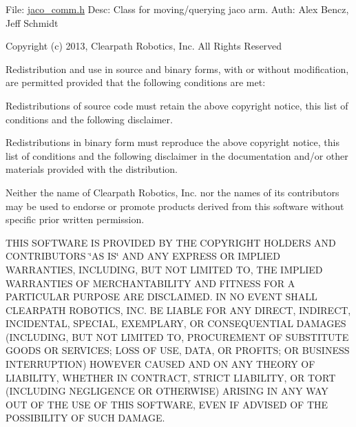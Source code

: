 File\+: \hyperlink{jaco__comm_8h}{jaco\+\_\+comm.\+h} Desc\+: Class for moving/querying jaco arm. Auth\+: Alex Bencz, Jeff Schmidt

Copyright (c) 2013, Clearpath Robotics, Inc. All Rights Reserved

Redistribution and use in source and binary forms, with or without modification, are permitted provided that the following conditions are met\+:
\begin{DoxyItemize}
\item Redistributions of source code must retain the above copyright notice, this list of conditions and the following disclaimer.
\item Redistributions in binary form must reproduce the above copyright notice, this list of conditions and the following disclaimer in the documentation and/or other materials provided with the distribution.
\item Neither the name of Clearpath Robotics, Inc. nor the names of its contributors may be used to endorse or promote products derived from this software without specific prior written permission.
\end{DoxyItemize}

T\+H\+IS S\+O\+F\+T\+W\+A\+RE IS P\+R\+O\+V\+I\+D\+ED BY T\+HE C\+O\+P\+Y\+R\+I\+G\+HT H\+O\+L\+D\+E\+RS A\+ND C\+O\+N\+T\+R\+I\+B\+U\+T\+O\+RS \char`\"{}\+A\+S I\+S\char`\"{} A\+ND A\+NY E\+X\+P\+R\+E\+SS OR I\+M\+P\+L\+I\+ED W\+A\+R\+R\+A\+N\+T\+I\+ES, I\+N\+C\+L\+U\+D\+I\+NG, B\+UT N\+OT L\+I\+M\+I\+T\+ED TO, T\+HE I\+M\+P\+L\+I\+ED W\+A\+R\+R\+A\+N\+T\+I\+ES OF M\+E\+R\+C\+H\+A\+N\+T\+A\+B\+I\+L\+I\+TY A\+ND F\+I\+T\+N\+E\+SS F\+OR A P\+A\+R\+T\+I\+C\+U\+L\+AR P\+U\+R\+P\+O\+SE A\+RE D\+I\+S\+C\+L\+A\+I\+M\+ED. IN NO E\+V\+E\+NT S\+H\+A\+LL C\+L\+E\+A\+R\+P\+A\+TH R\+O\+B\+O\+T\+I\+CS, I\+NC. BE L\+I\+A\+B\+LE F\+OR A\+NY D\+I\+R\+E\+CT, I\+N\+D\+I\+R\+E\+CT, I\+N\+C\+I\+D\+E\+N\+T\+AL, S\+P\+E\+C\+I\+AL, E\+X\+E\+M\+P\+L\+A\+RY, OR C\+O\+N\+S\+E\+Q\+U\+E\+N\+T\+I\+AL D\+A\+M\+A\+G\+ES (I\+N\+C\+L\+U\+D\+I\+NG, B\+UT N\+OT L\+I\+M\+I\+T\+ED TO, P\+R\+O\+C\+U\+R\+E\+M\+E\+NT OF S\+U\+B\+S\+T\+I\+T\+U\+TE G\+O\+O\+DS OR S\+E\+R\+V\+I\+C\+ES; L\+O\+SS OF U\+SE, D\+A\+TA, OR P\+R\+O\+F\+I\+TS; OR B\+U\+S\+I\+N\+E\+SS I\+N\+T\+E\+R\+R\+U\+P\+T\+I\+ON) H\+O\+W\+E\+V\+ER C\+A\+U\+S\+ED A\+ND ON A\+NY T\+H\+E\+O\+RY OF L\+I\+A\+B\+I\+L\+I\+TY, W\+H\+E\+T\+H\+ER IN C\+O\+N\+T\+R\+A\+CT, S\+T\+R\+I\+CT L\+I\+A\+B\+I\+L\+I\+TY, OR T\+O\+RT (I\+N\+C\+L\+U\+D\+I\+NG N\+E\+G\+L\+I\+G\+E\+N\+CE OR O\+T\+H\+E\+R\+W\+I\+SE) A\+R\+I\+S\+I\+NG IN A\+NY W\+AY O\+UT OF T\+HE U\+SE OF T\+H\+IS S\+O\+F\+T\+W\+A\+RE, E\+V\+EN IF A\+D\+V\+I\+S\+ED OF T\+HE P\+O\+S\+S\+I\+B\+I\+L\+I\+TY OF S\+U\+CH D\+A\+M\+A\+GE.

